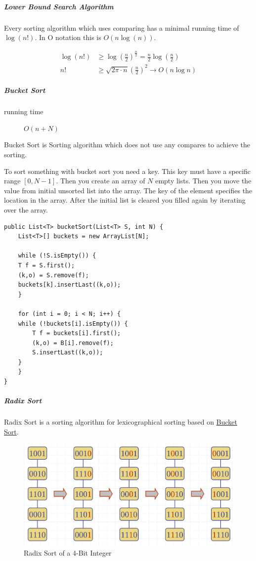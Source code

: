 \documentclass[11pt,twoside,twocolumn,landscape]{article}
\begin{document}
\subparagraph{Lower Bound Search Algorithm}
\label{sec:orgddd0b8a}

Every sorting algorithm which uses comparing has a minimal running time of \(\log(n!)\).
In O notation this is \(O(n \log(n))\).

\begin{align}
\log(n!) &\geq \log{(\frac{n}{2})^{\frac{n}{2}}} = \frac{n}{2}\log(\frac{n}{2}) \\
n! &\geq \sqrt{2\pi \cdot n}(\frac{n}{2})^2 \rightarrow O(n \log n)
\end{align}

\subparagraph{Bucket Sort}
\label{sec:orge60ce82}

\begin{description}
\item[{running time}] \(O(n + N)\)
\end{description}

Bucket Sort is Sorting algorithm which does not use any compares to achieve the sorting.

To sort something with bucket sort you need a key.
This key must have a specific range \([0, N-1]\).
Then you create an array of \(N\) empty lists.
Then you move the value from initial unsorted list into the array.
The key of the element specifies the location in the array.
After the initial list is cleared you filled again by iterating over the array.

\lstset{language=java,label= ,caption= ,captionpos=b,numbers=none}
\begin{lstlisting}
public List<T> bucketSort(List<T> S, int N) {
    List<T>[] buckets = new ArrayList[N];

    while (!S.isEmpty()) {
	T f = S.first();
	(k,o) = S.remove(f);
	buckets[k].insertLast((k,o));
    }

    for (int i = 0; i < N; i++) {
	while (!buckets[i].isEmpty()) {
	    T f = buckets[i].first();
	    (k,o) = B[i].remove(f);
	    S.insertLast((k,o));
	}
    }
}

\end{lstlisting}

\subparagraph{Radix Sort}
\label{sec:orgb468a43}

Radix Sort is a sorting algorithm for lexicographical sorting based on \href{../../../roam/20211215102604-bucket_sort.org}{Bucket Sort}.

\begin{figure}[htbp]
\centering
\includegraphics[width=.9\linewidth]{img/radix_sort.png}
\caption{\label{fig:org64b16d6}Radix Sort of a 4-Bit Integer}
\end{figure}
\end{document}
